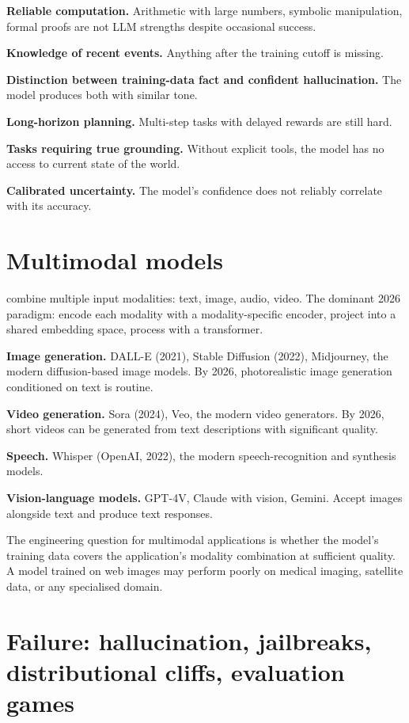 \textbf{Reliable computation.} Arithmetic with large numbers, symbolic manipulation, formal proofs are not LLM strengths despite occasional success.

\textbf{Knowledge of recent events.} Anything after the training cutoff is missing.

\textbf{Distinction between training-data fact and confident hallucination.} The model produces both with similar tone.

\textbf{Long-horizon planning.} Multi-step tasks with delayed rewards are still hard.

\textbf{Tasks requiring true grounding.} Without explicit tools, the model has no access to current state of the world.

\textbf{Calibrated uncertainty.} The model's confidence does not reliably correlate with its accuracy.

\section{Multimodal models}

 combine multiple input modalities: text, image, audio, video. The dominant 2026 paradigm: encode each modality with a modality-specific encoder, project into a shared embedding space, process with a transformer.

\textbf{Image generation.} DALL-E (2021), Stable Diffusion (2022), Midjourney, the modern diffusion-based image models. By 2026, photorealistic image generation conditioned on text is routine.

\textbf{Video generation.} Sora (2024), Veo, the modern video generators. By 2026, short videos can be generated from text descriptions with significant quality.

\textbf{Speech.} Whisper (OpenAI, 2022), the modern speech-recognition and synthesis models.

\textbf{Vision-language models.} GPT-4V, Claude with vision, Gemini. Accept images alongside text and produce text responses.

The engineering question for multimodal applications is whether the model's training data covers the application's modality combination at sufficient quality. A model trained on web images may perform poorly on medical imaging, satellite data, or any specialised domain.

\section{Failure: hallucination, jailbreaks, distributional cliffs, evaluation games}

